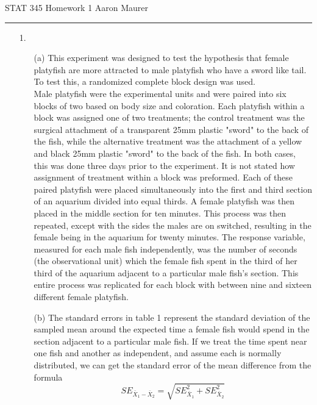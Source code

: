 \documentclass[11pt]{article}
\theoremstyle{definition}
\begin{document}
STAT 345 Homework 1 \hfill Aaron Maurer
\vspace{2mm}
\hrule
\vspace{2mm}

\begin{itemize}
    \item[1.]
        \begin{itemize}
            \item[(a)]
                This experiment was designed to test the hypothesis that female platyfish are more attracted to male platyfish who have a sword like tail. 
                To test this, a randomized complete block design was used. \\
                Male platyfish were the experimental units and were paired into six blocks of two based on body size and coloration. 
                Each platyfish within a block was assigned one of two treatments; the control treatment was the surgical attachment of a transparent 25mm plastic "sword" to the back of the fish, while the alternative treatment was the attachment of a yellow and black 25mm plastic "sword" to the back of the fish. In both cases, this was done three days prior to the experiment. It is not stated how assignment of treatment within a block was preformed. 
                Each of these paired platyfish were placed simultaneously into the first and third section of an aquarium divided into equal thirds. A female platyfish was then placed in the middle section for ten minutes. This process was then repeated, except with the sides the males are on switched, resulting in the female being in the aquarium for twenty minutes. The response variable, measured for each male fish independently, was the number of seconds (the observational unit) which the female fish spent in the third of her third of the aquarium adjacent to a particular male fish's section.
                This entire process was replicated for each block with between nine and sixteen different female platyfish.
            \item[(b)] The standard errors in table 1 represent the standard deviation of the sampled mean around the expected time a female fish would spend in the section adjacent to a particular male fish. If we treat the time spent near one fish and another as independent, and assume each is normally distributed, we can get the standard error of the mean difference from the formula
                \[ SE_{\bar X_1 - \bar X_2} = \sqrt{SE_{\bar X_1}^2 + SE_{\bar X_2}^2}\]

\end{itemize}
\end{itemize}
\end{document}
